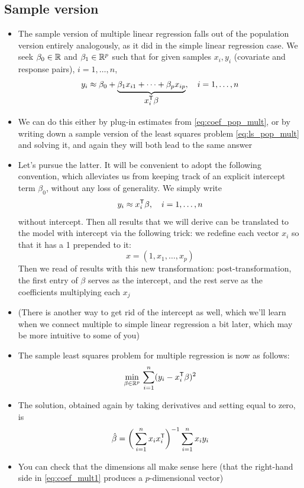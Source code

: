 \documentclass{article}
\begin{document}
\subsection{Sample version}

\begin{itemize}
\item The sample version of multiple linear regression falls out of the 
  population version entirely analogously, as it did in the simple linear
  regression case. We seek $\beta_0 \in \mathbb{R}$ and $\beta_1 \in \mathbb{R}^p$ 
  such that for given samples $x_i,y_i$ (covariate and response pairs), $i =
  1,\dots,n$,  
  \[
  y_i \approx \beta_0 + \underbrace{\beta_1 x_{i1} + \cdots + \beta_p 
    x_{ip}}_{\textstyle \begin{array}{c} x_i^{\mathsf{T}} \beta \end{array}}, \quad 
  i = 1,\dots,n 
  \]

\item We can do this either by plug-in estimates from \eqref{eq:coef_pop_mult},
  or by writing down a sample version of the least squares problem
  \eqref{eq:ls_pop_mult} and solving it, and again they will both lead to the 
  same answer

\item Let's pursue the latter. It will be convenient to adopt the following
  convention, which alleviates us from keeping track of an explicit intercept 
  term $\beta_0$, without any loss of generality. We simply write  
  \[
  y_i \approx x_i^{\mathsf{T}} \beta, \quad i = 1,\dots,n
  \]
  without intercept. Then all results that we will derive can be translated to
  the model with intercept via the following trick: we redefine each vector
  $x_i$ so that it has a 1 prepended to it:   
  \[
  x = (1, x_1, \dots, x_p)
  \]
  Then we read of results with this new transformation: post-transformation, the
  first entry of $\beta$ serves as the intercept, and the rest serve as the
  coefficients multiplying each $x_j$  

\item (There is another way to get rid of the intercept as well, which we'll
  learn when we connect multiple to simple linear regression a bit later, which
  may be more intuitive to some of you) 

\item The sample least squares problem for multiple regression is now as
  follows:  
  \begin{equation}
  \label{eq:ls_mult1}
  \min_{\beta \in \mathbb{R}^p} \, \sum_{i=1}^n (y_i - x_i^{\mathsf{T}} \beta)^2 
  \end{equation}

\item The solution, obtained again by taking derivatives and setting equal to
  zero, is
  \begin{equation}
  \label{eq:coef_mult1}
  \hat{\beta} = \bigg( \sum_{i=1}^n x_i x_i^{\mathsf{T}} \bigg)^{-1} \sum_{i=1}^n x_i y_i  
  \end{equation}

\item You can check that the dimensions all make sense here (that the right-hand
  side in \eqref{eq:coef_mult1} produces a $p$-dimensional vector)
\end{itemize}
\end{document}
